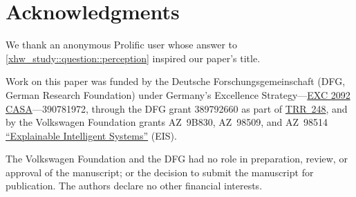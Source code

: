 \section*{Acknowledgments}
We thank an anonymous Prolific user whose answer to \autoref{xhw_study::question::perception} inspired our paper's title.

Work on this paper was funded by the Deutsche Forschungsgemeinschaft (DFG, German Research Foundation) under Germany's Excellence Strategy---\href{https://casa.rub.de}{EXC 2092 CASA}---390781972, through the DFG grant 389792660 as part of \href{https://perspicuous-computing.science}{TRR~248}, and by the Volkswagen Foundation grants AZ~9B830, AZ~98509, and AZ~98514 \href{https://explainable-intelligent.systems}{\enquote{Explainable Intelligent Systems}} (EIS). 

The Volkswagen Foundation and the DFG had no role in preparation, review, or approval of the manuscript; or the decision to submit the manuscript for publication. 
The authors declare no other financial interests.